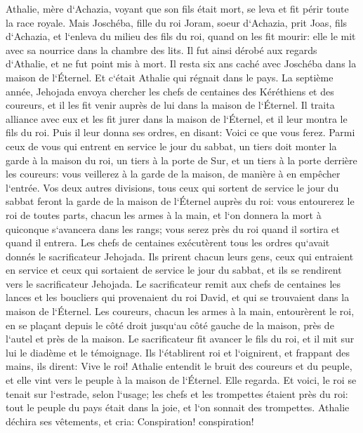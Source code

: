 \verse Athalie, mère d`Achazia, voyant que son fils était mort, se leva et fit périr toute la race royale. 
\verse Mais Joschéba, fille du roi Joram, soeur d`Achazia, prit Joas, fils d`Achazia, et l`enleva du milieu des fils du roi, quand on les fit mourir: elle le mit avec sa nourrice dans la chambre des lits. Il fut ainsi dérobé aux regards d`Athalie, et ne fut point mis à mort. 
\verse Il resta six ans caché avec Joschéba dans la maison de l`Éternel. Et c`était Athalie qui régnait dans le pays. 
\verse La septième année, Jehojada envoya chercher les chefs de centaines des Kéréthiens et des coureurs, et il les fit venir auprès de lui dans la maison de l`Éternel. Il traita alliance avec eux et les fit jurer dans la maison de l`Éternel, et il leur montra le fils du roi. 
\verse Puis il leur donna ses ordres, en disant: Voici ce que vous ferez. Parmi ceux de vous qui entrent en service le jour du sabbat, un tiers doit monter la garde à la maison du roi, 
\verse un tiers à la porte de Sur, et un tiers à la porte derrière les coureurs: vous veillerez à la garde de la maison, de manière à en empêcher l`entrée. 
\verse Vos deux autres divisions, tous ceux qui sortent de service le jour du sabbat feront la garde de la maison de l`Éternel auprès du roi: 
\verse vous entourerez le roi de toutes parts, chacun les armes à la main, et l`on donnera la mort à quiconque s`avancera dans les rangs; vous serez près du roi quand il sortira et quand il entrera. 
\verse Les chefs de centaines exécutèrent tous les ordres qu`avait donnés le sacrificateur Jehojada. Ils prirent chacun leurs gens, ceux qui entraient en service et ceux qui sortaient de service le jour du sabbat, et ils se rendirent vers le sacrificateur Jehojada. 
\verse Le sacrificateur remit aux chefs de centaines les lances et les boucliers qui provenaient du roi David, et qui se trouvaient dans la maison de l`Éternel. 
\verse Les coureurs, chacun les armes à la main, entourèrent le roi, en se plaçant depuis le côté droit jusqu`au côté gauche de la maison, près de l`autel et près de la maison. 
\verse Le sacrificateur fit avancer le fils du roi, et il mit sur lui le diadème et le témoignage. Ils l`établirent roi et l`oignirent, et frappant des mains, ils dirent: Vive le roi! 
\verse Athalie entendit le bruit des coureurs et du peuple, et elle vint vers le peuple à la maison de l`Éternel. 
\verse Elle regarda. Et voici, le roi se tenait sur l`estrade, selon l`usage; les chefs et les trompettes étaient près du roi: tout le peuple du pays était dans la joie, et l`on sonnait des trompettes. Athalie déchira ses vêtements, et cria: Conspiration! conspiration! 
